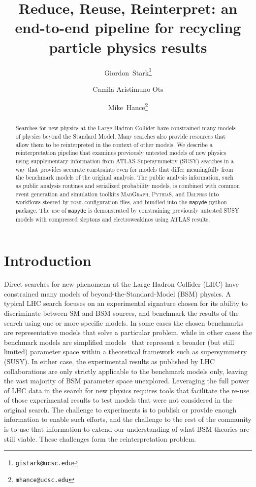 \documentclass{article}
\title{Reduce, Reuse, Reinterpret: an end-to-end pipeline for recycling particle physics results}
\author[ \,,1]{\orcidaffil{0000-0001-6616-3433}Giordon~Stark\thanks{\texttt{gistark@ucsc.edu}}}
\author[1,2]{Camila Aristimuno Ots}
\author[ \,,1]{\orcidaffil{0000-0001-8392-0934}Mike~Hance\thanks{\texttt{mhance@ucsc.edu}}}
\affil[1]{University of California, Santa Cruz\\ Santa Cruz Institute for Particle Physics\\1156 High Street\\Santa Cruz, CA 95064}
\affil[2]{University of Southern California\\ Liquid Propulsion Laboratory\\ 854 Downey Way, Los Angeles, CA 90089}
\newcommand{\mapyde}{\texttt{mapyde}}
\newcommand{\madgraph}{\textsc{MadGraph}}
\newcommand{\pythia}{\textsc{Pythia8}}
\newcommand{\delphes}{\textsc{Delphes}}
\newcommand{\toml}{\textsc{toml}}
\begin{document}
\maketitle

\begin{abstract}
	Searches for new physics at the Large Hadron Collider have constrained many models of physics beyond the Standard Model.  Many searches also provide resources that allow them to be reinterpreted in the context of other models.  We describe a reinterpretation pipeline that examines previously untested models of new physics using supplementary information from ATLAS Supersymmetry (SUSY) searches in a way that provides accurate constraints even for models that differ meaningfully from the benchmark models of the original analysis.  The public analysis information, such as public analysis routines and serialized probability models, is combined with common event generation and simulation toolkits \madgraph, \pythia, and \delphes{} into workflows steered by \toml{} configuration files, and bundled into the \mapyde{} python package.  The use of \mapyde{} is demonstrated by constraining previously untested SUSY models with compressed sleptons and electroweakinos using ATLAS results.
\end{abstract}


\section{Introduction}
\label{sec:introduction}

Direct searches for new phenomena at the Large Hadron Collider (LHC) have constrained many models of beyond-the-Standard-Model (BSM) physics.  A typical LHC search focuses on an experimental signature chosen for its ability to discriminate between SM and BSM sources, and benchmark the results of the search using one or more specific models.  In some cases the chosen benchmarks are representative models that solve a particular problem, while in other cases the benchmark models are simplified models~\cite{LHCNewPhysicsWorkingGroup:2011mji} that represent a broader (but still limited) parameter space within a theoretical framework such as supersymmetry (SUSY).  In either case, the experimental results as published by LHC collaborations are only strictly applicable to the benchmark models only, leaving the vast majority of BSM parameter space unexplored.  Leveraging the full power of LHC data in the search for new physics requires tools that facilitate the re-use of those experimental results to test models that were not considered in the original search.  The challenge to experiments is to publish or provide enough information to enable such efforts, and the challenge to the rest of the community is to use that information to extend our understanding of what BSM theories are still viable.  These challenges form the reinterpretation problem.
\end{document}
